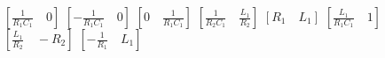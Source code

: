 $[\frac{1}{R_1 C_1}\quad 0]$
$[-\frac{1}{R_1 C_1}\quad 0]$
$[0\quad \frac{1}{R_1 C_1}]$
$[\frac{1}{R_2 C_1} \quad \frac{L_1}{R_2}]$
$[R_1\quad L_1]$
$[\frac{L_1}{R_1 C_1} \quad 1]$
$[\frac{L_1}{R_2}\quad -R_2]$
$[-\frac{1}{R_1}\quad L_1]$
